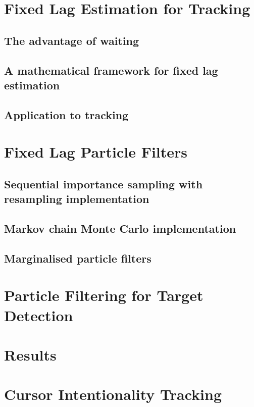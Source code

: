 \documentclass{RJWThesis}
\begin{document}
\chapter{Fixed Lag Estimation for Tracking}\label{FixedLag}
\section{The advantage of waiting}

\section{A mathematical framework for fixed lag estimation}
\label{sec:FixedLag2}
\section{Application to tracking}\label{FixedLag_App}


\chapter{Fixed Lag Particle Filters}
\section{Sequential importance sampling with resampling implementation}

\section{Markov chain Monte Carlo implementation}

\section{Marginalised particle filters}


\chapter{Particle Filtering for Target Detection}


\chapter{Results}



\chapter{Cursor Intentionality Tracking}

\end{document}

